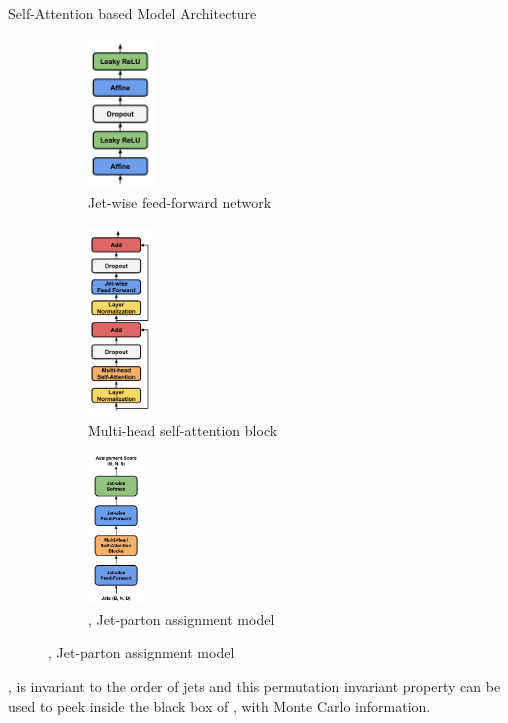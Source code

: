 \begin{frame}[fragile]{Self-Attention based Model Architecture \saja}
    \begin{figure}
        \centering
        \begin{subfigure}[t]{0.3\textwidth}
            \centering
            \includegraphics[width=\textwidth, height=4cm, keepaspectratio]{fig/model/jet-wise-feed-forward.pdf}
            \caption{Jet-wise feed-forward network}
        \end{subfigure}
        \hfill  
        \begin{subfigure}[t]{0.3\textwidth}
            \centering
            \includegraphics[width=\textwidth, height=5cm, keepaspectratio]{fig/model/attention-block.pdf}
            \caption{Multi-head self-attention block}
        \end{subfigure}
        \hfill
        \begin{subfigure}[t]{0.3\textwidth}
            \centering
            \includegraphics[width=\textwidth, height=4cm, keepaspectratio]{fig/model/model.pdf}
            \caption{\saja, Jet-parton assignment model}
        \end{subfigure}
      \hfill
    \end{figure}

    {\footnotesize \saja, is invariant to the order of jets and this permutation
     invariant property can be used to peek inside the black box of \saja,
     with Monte Carlo information.}
\end{frame}

